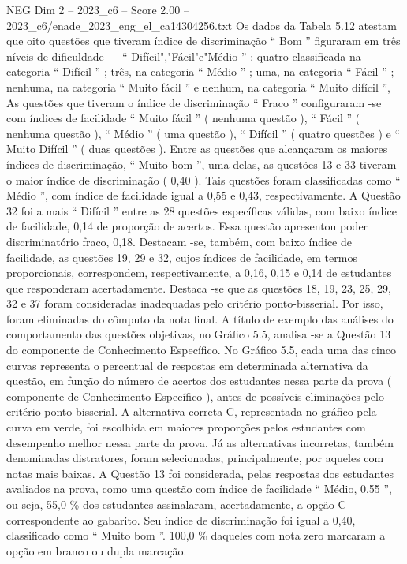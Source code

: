 \begin{textsample}{NEG Dim 2 – 2023\_c6 – Score 2.00 – 2023\_c6/enade\_2023\_eng\_el\_ca14304256.txt}
Os dados da Tabela 5.12 atestam que oito questões que tiveram índice de discriminação “ Bom ” figuraram em três níveis de dificuldade — “ Difícil","Fácil"e"Médio ” : quatro classificada na categoria “ Difícil ” ; três, na categoria “ Médio ” ; uma, na categoria “ Fácil ” ; nenhuma, na categoria “ Muito fácil ” e nenhum, na categoria “ Muito difícil ”, As questões que tiveram o índice de discriminação “ Fraco ” configuraram -se com índices de facilidade “ Muito fácil ” ( nenhuma questão ), “ Fácil ” ( nenhuma questão ), “ Médio ” ( uma questão ), “ Difícil ” ( quatro questões ) e “ Muito Difícil ” ( duas questões ).
Entre as questões que alcançaram os maiores índices de discriminação, “ Muito bom ”, uma delas, as questões 13 e 33 tiveram o maior índice de discriminação ( 0,40 ).
Tais questões foram classificadas como “ Médio ”, com índice de facilidade igual a 0,55 e 0,43, respectivamente.
A Questão 32 foi a mais “ Difícil ” entre as 28 questões específicas válidas, com baixo índice de facilidade, 0,14 de proporção de acertos.
Essa questão apresentou poder discriminatório fraco, 0,18.
Destacam -se, também, com baixo índice de facilidade, as questões 19, 29 e 32, cujos índices de facilidade, em termos proporcionais, correspondem, respectivamente, a 0,16, 0,15 e 0,14 de estudantes que responderam acertadamente.
Destaca -se que as questões 18, 19, 23, 25, 29, 32 e 37 foram consideradas inadequadas pelo critério ponto-bisserial.
Por isso, foram eliminadas do cômputo da nota final.
A título de exemplo das análises do comportamento das questões objetivas, no Gráfico 5.5, analisa -se a Questão 13 do componente de Conhecimento Específico.
No Gráfico 5.5, cada uma das cinco curvas representa o percentual de respostas em determinada alternativa da questão, em função do número de acertos dos estudantes nessa parte da prova ( componente de Conhecimento Específico ), antes de possíveis eliminações pelo critério ponto-bisserial.
A alternativa correta C, representada no gráfico pela curva em verde, foi escolhida em maiores proporções pelos estudantes com desempenho melhor nessa parte da prova.
Já as alternativas incorretas, também denominadas distratores, foram selecionadas, principalmente, por aqueles com notas mais baixas.
A Questão 13 foi considerada, pelas respostas dos estudantes avaliados na prova, como uma questão com índice de facilidade “ Médio, 0,55 ”, ou seja, 55,0 \% dos estudantes assinalaram, acertadamente, a opção C correspondente ao gabarito.
Seu índice de discriminação foi igual a 0,40, classificado como “ Muito bom ”. 100,0 \% daqueles com nota zero marcaram a opção em branco ou dupla marcação.

\end{textsample}
